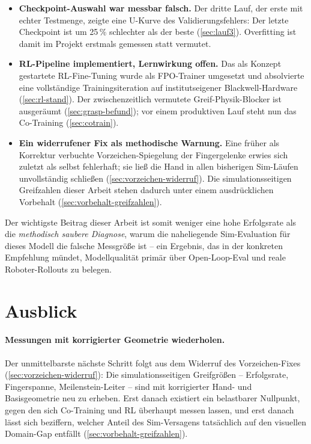 \begin{itemize}
    volle Greifbewegung (Verhältnis~1,00), in der Simulation nur ein Fünftel.
    Die Politik hat das Greifen also gelernt und ruft es nur bei synthetischer
    Beobachtung nicht ab.
  \item \textbf{Checkpoint-Auswahl war messbar falsch.} Der dritte Lauf, der
    erste mit echter Testmenge, zeigte eine U-Kurve des Validierungsfehlers:
    Der letzte Checkpoint ist um 25\,\% schlechter als der beste
    (\cref{sec:lauf3}). Overfitting ist damit im Projekt erstmals gemessen
    statt vermutet.
  \item \textbf{RL-Pipeline implementiert, Lernwirkung offen.} Das als
    Konzept gestartete RL-Fine-Tuning wurde als FPO-Trainer umgesetzt und
    absolvierte eine vollständige Trainingsiteration auf institutseigener
    Blackwell-Hardware (\cref{sec:rl-stand}). Der zwischenzeitlich vermutete
    Greif-Physik-Blocker ist ausgeräumt (\cref{sec:grasp-befund}); vor einem
    produktiven Lauf steht nun das Co-Training (\cref{sec:cotrain}).
  \item \textbf{Ein widerrufener Fix als methodische Warnung.} Eine früher als
    Korrektur verbuchte Vorzeichen-Spiegelung der Fingergelenke erwies sich
    zuletzt als selbst fehlerhaft; sie ließ die Hand in allen bisherigen
    Sim-Läufen unvollständig schließen (\cref{sec:vorzeichen-widerruf}). Die
    simulationsseitigen Greifzahlen dieser Arbeit stehen dadurch unter einem
    ausdrücklichen Vorbehalt (\cref{sec:vorbehalt-greifzahlen}).
\end{itemize}

Der wichtigste Beitrag dieser Arbeit ist somit weniger eine hohe Erfolgsrate als
die \emph{methodisch saubere Diagnose}, warum die naheliegende Sim-Evaluation für
dieses Modell die falsche Messgröße ist -- ein Ergebnis, das in der konkreten
Empfehlung mündet, Modellqualität primär über Open-Loop-Eval und reale
Roboter-Rollouts zu belegen.

\section{Ausblick}
\label{sec:ausblick}

\paragraph{Messungen mit korrigierter Geometrie wiederholen.}
Der unmittelbarste nächste Schritt folgt aus dem Widerruf des Vorzeichen-Fixes
(\cref{sec:vorzeichen-widerruf}): Die simulationsseitigen Greifgrößen --
Erfolgsrate, Fingerspanne, Meilenstein-Leiter -- sind mit korrigierter
Hand- und Basisgeometrie neu zu erheben. Erst danach existiert ein belastbarer
Nullpunkt, gegen den sich Co-Training und RL überhaupt messen lassen, und erst
danach lässt sich beziffern, welcher Anteil des Sim-Versagens tatsächlich auf
den visuellen Domain-Gap entfällt (\cref{sec:vorbehalt-greifzahlen}).

